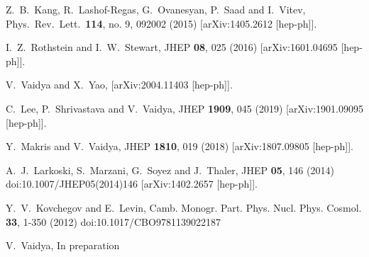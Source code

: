 \documentclass[letter,11pt]{article}
\begin{document}
\begin{thebibliography}{99}
  Z.~B.~Kang, R.~Lashof-Regas, G.~Ovanesyan, P.~Saad and I.~Vitev,
  Phys.\ Rev.\ Lett.\  {\bf 114}, no. 9, 092002 (2015)
  [arXiv:1405.2612 [hep-ph]].

I.~Z.~Rothstein and I.~W.~Stewart,
JHEP \textbf{08}, 025 (2016)
[arXiv:1601.04695 [hep-ph]].

V.~Vaidya and X.~Yao,
[arXiv:2004.11403 [hep-ph]].
	


  C.~Lee, P.~Shrivastava and V.~Vaidya,
  JHEP {\bf 1909}, 045 (2019)
  [arXiv:1901.09095 [hep-ph]].
  
  Y.~Makris and V.~Vaidya,
  JHEP {\bf 1810}, 019 (2018)
  [arXiv:1807.09805 [hep-ph]].
  
A.~J.~Larkoski, S.~Marzani, G.~Soyez and J.~Thaler,
JHEP \textbf{05}, 146 (2014)
doi:10.1007/JHEP05(2014)146
[arXiv:1402.2657 [hep-ph]].  
  



Y.~V.~Kovchegov and E.~Levin,
Camb. Monogr. Part. Phys. Nucl. Phys. Cosmol. \textbf{33}, 1-350 (2012)
doi:10.1017/CBO9781139022187


V.~Vaidya,
In preparation
\end{thebibliography}
 
\end{document}

